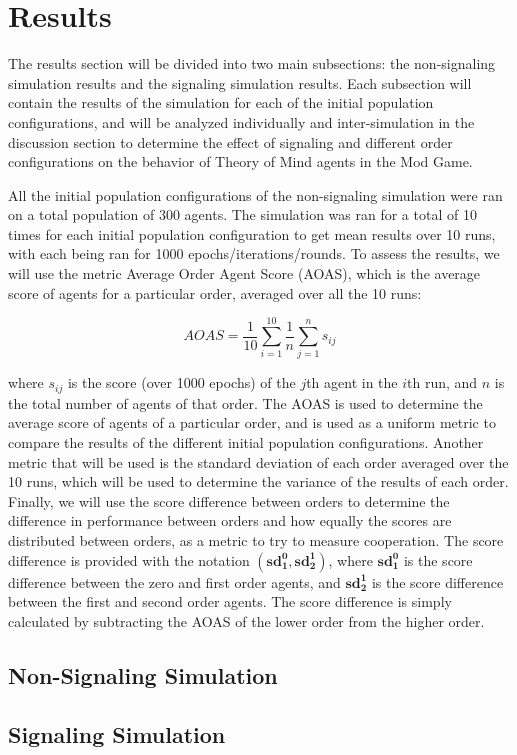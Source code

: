\section{Results}\label{sec:results}

The results section will be divided into two main subsections: the non-signaling simulation results and the signaling simulation results. Each subsection will contain the results of the simulation for each of the initial population configurations, and will be analyzed individually and inter-simulation in the discussion section to determine the effect of signaling and different order configurations on the behavior of Theory of Mind agents in the Mod Game.

All the initial population configurations of the non-signaling simulation were ran on a total population of 300 agents. The simulation was ran for a total of 10 times for each initial population configuration to get mean results over 10 runs, with each being ran for 1000 epochs/iterations/rounds. To assess the results, we will use the metric Average Order Agent Score (AOAS), which is the average score of agents for a particular order, averaged over all the 10 runs: 

\begin{equation}
AOAS = \frac{1}{10} \sum_{i=1}^{10} \frac{1}{n} \sum_{j=1}^{n} s_{ij}
\label{eq:aoas}
\end{equation}

where $s_{ij}$ is the score (over 1000 epochs) of the $j$th agent in the $i$th run, and $n$ is the total number of agents of that order. The AOAS is used to determine the average score of agents of a particular order, and is used as a uniform metric to compare the results of the different initial population configurations. Another metric that will be used is the standard deviation of each order averaged over the 10 runs, which will be used to determine the variance of the results of each order. Finally, we will use the score difference between orders to determine the difference in performance between orders and how equally the scores are distributed between orders, as a metric to try to measure cooperation. The score difference is provided with the notation $(\mathbf{sd^0_1}, \mathbf{sd^1_2})$, where $\mathbf{sd^0_1}$ is the score difference between the zero and first order agents, and $\mathbf{sd^1_2}$ is the score difference between the first and second order agents. The score difference is simply calculated by subtracting the AOAS of the lower order from the higher order. 

\subsection{Non-Signaling Simulation}



\subsection{Signaling Simulation}

